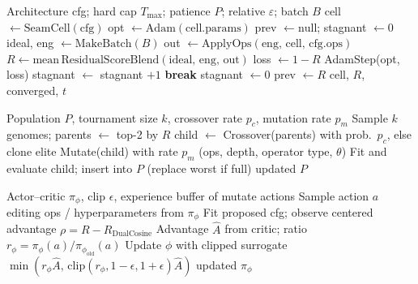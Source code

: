 \begin{algorithm}[t]
\caption{FitCell (inner loop; converge protocol)}
\label{alg:fit}
\begin{algorithmic}[1]
\Require Architecture cfg; hard cap $T_{\max}$; patience $P$; relative $\varepsilon$; batch $B$
\State cell $\gets \mathrm{SeamCell}(\mathrm{cfg})$
\State opt $\gets \mathrm{Adam}(\mathrm{cell.params})$
\State prev $\gets \mathrm{null}$; stagnant $\gets 0$
  \State ideal, eng $\gets \mathrm{MakeBatch}(B)$
  \State out $\gets \mathrm{ApplyOps}(\mathrm{eng},\,\mathrm{cell},\,\mathrm{cfg.ops})$
  \State $R \gets \mathrm{mean}\,\mathrm{ResidualScoreBlend}(\mathrm{ideal},\,\mathrm{eng},\,\mathrm{out})$
  \State loss $\gets 1-R$
    \State AdamStep(opt, loss)
  \EndIf
    \State stagnant $\gets$ stagnant $+1$
      \State \textbf{break} 
    \EndIf
  \Else
    \State stagnant $\gets 0$
  \EndIf
  \State prev $\gets R$
\EndFor
\State \Return cell, $R$, converged, $t$
\end{algorithmic}
\end{algorithm}

\begin{algorithm}[t]
\caption{GA tournament step}
\label{alg:ga}
\begin{algorithmic}[1]
\Require Population $P$, tournament size $k$, crossover rate $p_c$, mutation rate $p_m$
\State Sample $k$ genomes; parents $\gets$ top-2 by $R$
\State child $\gets$ Crossover(parents) with prob.\ $p_c$, else clone elite
\State Mutate(child) with rate $p_m$ (ops, depth, operator type, $\theta$)
\State Fit and evaluate child; insert into $P$ (replace worst if full)
\State \Return updated $P$
\end{algorithmic}
\end{algorithm}

\begin{algorithm}[t]
\caption{PPO architecture update}
\label{alg:ppo}
\begin{algorithmic}[1]
\Require Actor--critic $\pi_\phi$, clip $\epsilon$, experience buffer of mutate actions
\State Sample action $a$ editing ops / hyperparameters from $\pi_\phi$
\State Fit proposed cfg; observe centered advantage $\rho = R - R_{\mathrm{DualCosine}}$ 
\State Advantage $\hat{A}$ from critic; ratio $r_\phi = \pi_\phi(a)/\pi_{\phi_{\mathrm{old}}}(a)$
\State Update $\phi$ with clipped surrogate $\min(r_\phi\hat{A},\,\mathrm{clip}(r_\phi,1-\epsilon,1+\epsilon)\hat{A})$
\State \Return updated $\pi_\phi$
\end{algorithmic}
\end{algorithm}

